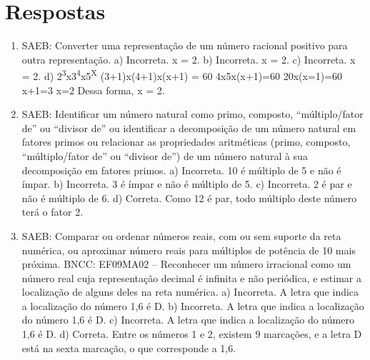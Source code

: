 \chapter{Respostas}
\pagestyle{plain}
\footnotesize

\pagecolor{gray!40}


\begin{enumerate}
\item
SAEB: Converter uma representação de um número 
racional positivo para outra representação.
a) Incorreta. x = 2. 
b) Incorreta. x = 2.
c) Incorreta. x = 2.  
d) 2\textsuperscript{3}x3\textsuperscript{4}x5\textsuperscript{X} \rightarrow 
(3+1)x(4+1)x(x+1) = 60 \rightarrow 4x5x(x+1)=60 
20x(x=1)=60 \rightarrow x+1=3 \therefore x=2
Dessa forma, x = 2.

\item
SAEB: Identificar um número natural como primo, composto, 
``múltiplo/fator de'' ou ``divisor de'' ou identificar a decomposição de
um número natural em fatores primos ou relacionar as propriedades aritméticas
(primo, composto, ``múltiplo/fator de'' ou ``divisor de'') de um
número natural à sua decomposição em fatores primos.
a) Incorreta. 10 é múltiplo de 5 e não é ímpar.
b) Incorreta. 3 é ímpar e não é múltiplo de 5.
c) Incorreta. 2 é par e não é múltiplo de 6.
d) Correta. Como 12 é par, todo múltiplo deste número terá o fator 2.

\item
SAEB: Comparar ou ordenar números reais, com ou sem suporte da reta
numérica, ou aproximar número reais para múltiplos de potência de 10
mais próxima.
BNCC: EF09MA02 -- Reconhecer um número irracional como um número real cuja representação decimal é infinita e não periódica, e estimar a localização de alguns deles na reta numérica.
a) Incorreta. A letra que indica a localização do número 1,6 é D.
b) Incorreta. A letra que indica a localização do número 1,6 é D.
c) Incorreta. A letra que indica a localização do número 1,6 é D.
d) Correta. Entre os números 1 e 2, existem 9 marcações, e a letra D está
na sexta marcação, o que corresponde a 1,6.
\end{enumerate}


